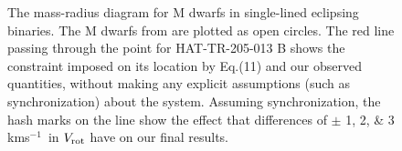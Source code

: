 \documentclass[12pt, preprint]{aastex}
\newcommand\kms{\ifmmode{\rm km\thinspace s^{-1}}\else km\thinspace s$^{-1}$\fi}
\begin{document}
\clearpage
\begin{figure}
\caption{The mass-radius diagram for M dwarfs in single-lined
eclipsing binaries. The M dwarfs from \cite{pont2005a,pont2005b,pont2006} are
plotted as open circles. The red line passing through the point for
HAT-TR-205-013 B shows the constraint imposed on its location by Eq.(11) and our observed quantities, without making any explicit assumptions (such as synchronization) about the system. Assuming synchronization, the hash marks on the line show the effect that differences of $\pm$ 1, 2, \& 3 \kms \ in $V_{\rm rot}$ have on our final results. \label{fig6}}
\end{figure}
\end{document}
